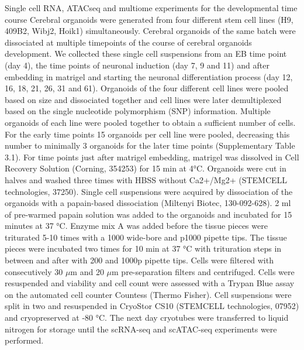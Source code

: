 Single cell RNA, ATACseq and multiome experiments for the developmental time course
Cerebral organoids were generated from four different stem cell lines (H9, 409B2, Wibj2, Hoik1) simultaneously. Cerebral organoids of the same batch were dissociated at multiple timepoints of the course of cerebral organoids development. We collected these single cell suspensions from an EB time point (day 4), the time points of neuronal induction (day 7, 9 and 11) and after embedding in matrigel and starting the neuronal differentiation process (day 12, 16, 18, 21, 26, 31 and 61). Organoids of the four different cell lines were pooled based on size and dissociated together and cell lines were later demultiplexed based on the single nucleotide polymorphism (SNP) information. Multiple organoids of each line were pooled together to obtain a sufficient number of cells. For the early time points 15 organoids per cell line were pooled, decreasing this number to minimally 3 organoids for the later time points (Supplementary Table 3.1). For time points just after matrigel embedding, matrigel was dissolved in Cell Recovery Solution (Corning, 354253)​​ for 15 min at 4°C. Organoids were cut in halves and washed three times with HBSS without Ca2+/Mg2+ (STEMCELL technologies, 37250). Single cell suspensions were acquired by dissociation of the organoids with a papain-based dissociation (Miltenyi Biotec, 130-092-628). 2 ml of pre-warmed papain solution was added to the  organoids and incubated for 15 minutes at 37 °C. Enzyme mix A was added before the tissue pieces were triturated 5-10 times with a 1000 wide-bore and p1000 pipette tips.  The tissue pieces were incubated two times for 10 min at 37 °C with trituration steps in between and after with 200 and 1000p pipette tips. Cells were filtered with consecutively 30 $\mu$m and 20 $\mu$m pre-separation filters and centrifuged. Cells were resuspended and viability and cell count were assessed with a Trypan Blue assay on the automated cell counter Countess (Thermo Fisher). Cell suspensions were split in two and resuspended in CryoStor CS10 (STEMCELL technologies, 07952) and cryopreserved at -80 °C. The next day cryotubes were transferred to liquid nitrogen for storage until the scRNA-seq and scATAC-seq experiments were performed.

